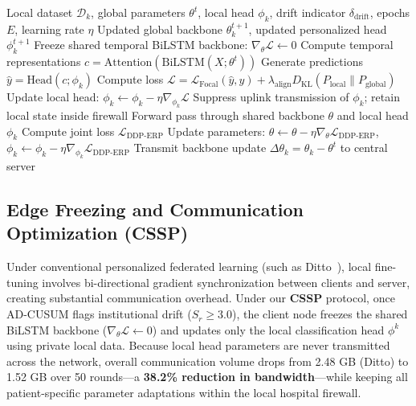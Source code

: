 \documentclass[11pt,a4paper]{article}
\begin{document}
\begin{algorithm}[htbp]
\caption{Dynamic Dual-Phase Saliency \& Entropy-Regularized Personalization (DDP-ERP) with CSSP}\label{alg:ddp_erp}
\begin{algorithmic}[1]
\Require Local dataset $\mathcal{D}_k$, global parameters $\theta^t$, local head $\phi_k$, drift indicator $\delta_{\text{drift}}$, epochs $E$, learning rate $\eta$
\Ensure Updated global backbone $\theta_k^{t+1}$, updated personalized head $\phi_k^{t+1}$
 
    \State Freeze shared temporal BiLSTM backbone: $\nabla_\theta \mathcal{L} \leftarrow 0$
            \State Compute temporal representations $c = \text{Attention}(\text{BiLSTM}(X; \theta^t))$
            \State Generate predictions $\hat{y} = \text{Head}(c; \phi_k)$
            \State Compute loss $\mathcal{L} = \mathcal{L}_{\text{Focal}}(\hat{y}, y) + \lambda_{\text{align}} D_{\text{KL}}(P_{\text{local}} \parallel P_{\text{global}})$
            \State Update local head: $\phi_k \leftarrow \phi_k - \eta \nabla_{\phi_k} \mathcal{L}$
        \EndFor
    \EndFor
    \State Suppress uplink transmission of $\phi_k$; retain local state inside firewall
\Else {}
            \State Forward pass through shared backbone $\theta$ and local head $\phi_k$
            \State Compute joint loss $\mathcal{L}_{\text{DDP-ERP}}$
            \State Update parameters: $\theta \leftarrow \theta - \eta \nabla_\theta \mathcal{L}_{\text{DDP-ERP}}$, $\phi_k \leftarrow \phi_k - \eta \nabla_{\phi_k} \mathcal{L}_{\text{DDP-ERP}}$
        \EndFor
    \EndFor
    \State Transmit backbone update $\Delta \theta_k = \theta_k - \theta^t$ to central server
\EndIf
\end{algorithmic}
\end{algorithm}

\subsection{Edge Freezing and Communication Optimization (CSSP)}
Under conventional personalized federated learning (such as Ditto~\cite{li2021ditto}), local fine-tuning involves bi-directional gradient synchronization between clients and server, creating substantial communication overhead. Under our \textbf{CSSP} protocol, once AD-CUSUM flags institutional drift ($S_r \ge 3.0$), the client node freezes the shared BiLSTM backbone ($\nabla_\theta \mathcal{L} \leftarrow 0$) and updates only the local classification head $\phi^k$ using private local data. Because local head parameters are never transmitted across the network, overall communication volume drops from 2.48 GB (Ditto) to 1.52 GB over 50 rounds---a \textbf{38.2\% reduction in bandwidth}---while keeping all patient-specific parameter adaptations within the local hospital firewall.
\end{document}
